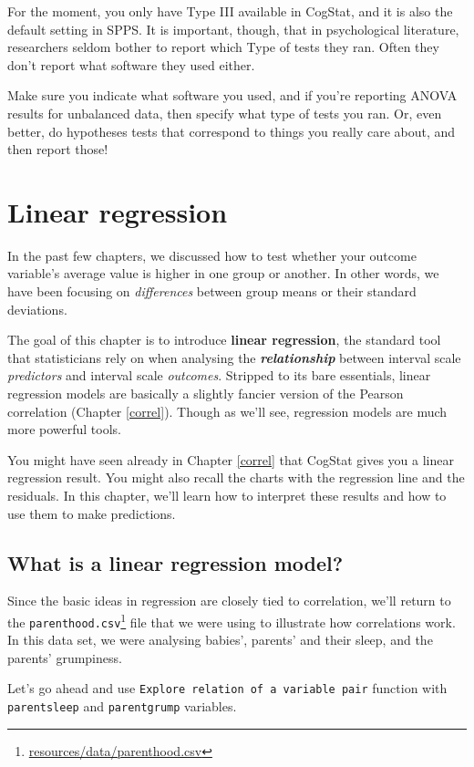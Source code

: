 \documentclass[
  11pt,
  a4paper,
  twoside,symmetric,openright]{book}
\theoremstyle{break}
\theoremstyle{break}
\DeclareRobustCommand{\href}[2]{#2\footnote{\url{#1}}}
\begin{document}
For the moment, you only have Type III available in CogStat, and it is also the default setting in SPPS. It is important, though, that in psychological literature, researchers seldom bother to report which Type of tests they ran. Often they don't report what software they used either.

Make sure you indicate what software you used, and if you're reporting ANOVA results for unbalanced data, then specify what type of tests you ran. Or, even better, do hypotheses tests that correspond to things you really care about, and then report those!

\chapter{Linear regression}\label{regression}

In the past few chapters, we discussed how to test whether your outcome variable's average value is higher in one group or another. In other words, we have been focusing on \emph{differences} between group means or their standard deviations.

The goal of this chapter is to introduce \textbf{linear regression}, the standard tool that statisticians rely on when analysing the \textbf{\emph{relationship}} between interval scale \emph{predictors} and interval scale \emph{outcomes}. Stripped to its bare essentials, linear regression models are basically a slightly fancier version of the Pearson correlation (Chapter \ref{correl}). Though as we'll see, regression models are much more powerful tools.

You might have seen already in Chapter \ref{correl} that CogStat gives you a linear regression result. You might also recall the charts with the regression line and the residuals. In this chapter, we'll learn how to interpret these results and how to use them to make predictions.

\section{What is a linear regression model?}\label{introregression}

Since the basic ideas in regression are closely tied to correlation, we'll return to the \href{resources/data/parenthood.csv}{\texttt{parenthood.csv}} file that we were using to illustrate how correlations work. In this data set, we were analysing babies', parents' and their sleep, and the parents' grumpiness.

Let's go ahead and use \texttt{Explore\ relation\ of\ a\ variable\ pair} function with \texttt{parentsleep} and \texttt{parentgrump} variables.
\end{document}
